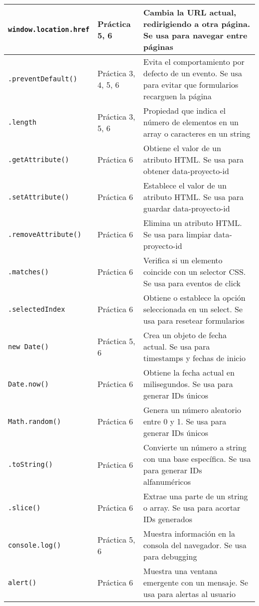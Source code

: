 \documentclass[12pt,a4paper]{article}
\begin{document}
\begin{longtable}{|p{3cm}|p{4cm}|p{8cm}|}
\texttt{window.location.href} & Práctica 5, 6 & Cambia la URL actual, redirigiendo a otra página. Se usa para navegar entre páginas \\
\hline

\texttt{.preventDefault()} & Práctica 3, 4, 5, 6 & Evita el comportamiento por defecto de un evento. Se usa para evitar que formularios recarguen la página \\
\hline

\texttt{.length} & Práctica 3, 5, 6 & Propiedad que indica el número de elementos en un array o caracteres en un string \\
\hline

\texttt{.getAttribute()} & Práctica 6 & Obtiene el valor de un atributo HTML. Se usa para obtener data-proyecto-id \\
\hline

\texttt{.setAttribute()} & Práctica 6 & Establece el valor de un atributo HTML. Se usa para guardar data-proyecto-id \\
\hline

\texttt{.removeAttribute()} & Práctica 6 & Elimina un atributo HTML. Se usa para limpiar data-proyecto-id \\
\hline

\texttt{.matches()} & Práctica 6 & Verifica si un elemento coincide con un selector CSS. Se usa para eventos de click \\
\hline

\texttt{.selectedIndex} & Práctica 6 & Obtiene o establece la opción seleccionada en un select. Se usa para resetear formularios \\
\hline

\texttt{new Date()} & Práctica 5, 6 & Crea un objeto de fecha actual. Se usa para timestamps y fechas de inicio \\
\hline

\texttt{Date.now()} & Práctica 6 & Obtiene la fecha actual en milisegundos. Se usa para generar IDs únicos \\
\hline

\texttt{Math.random()} & Práctica 6 & Genera un número aleatorio entre 0 y 1. Se usa para generar IDs únicos \\
\hline

\texttt{.toString()} & Práctica 6 & Convierte un número a string con una base específica. Se usa para generar IDs alfanuméricos \\
\hline

\texttt{.slice()} & Práctica 6 & Extrae una parte de un string o array. Se usa para acortar IDs generados \\
\hline

\texttt{console.log()} & Práctica 5, 6 & Muestra información en la consola del navegador. Se usa para debugging \\
\hline

\texttt{alert()} & Práctica 6 & Muestra una ventana emergente con un mensaje. Se usa para alertas al usuario \\
\hline

\end{longtable}
\end{document}
